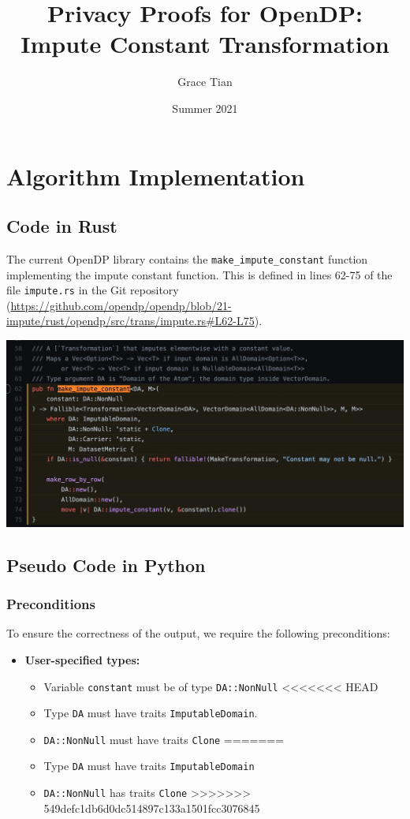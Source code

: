 \documentclass[11pt,a4paper]{article}
\title{Privacy Proofs for OpenDP: Impute Constant Transformation}
\author{Grace Tian}
\date{Summer 2021}
\begin{document}
\maketitle
\tableofcontents

\section{Algorithm Implementation}
\subsection{Code in Rust}
The current OpenDP library contains the \texttt{make\_impute\_constant} function implementing the impute constant function. This is defined in lines 62-75 of the file \texttt{impute.rs} in the Git repository (\url{https://github.com/opendp/opendp/blob/21-impute/rust/opendp/src/trans/impute.rs#L62-L75}).

\includegraphics[width=\textwidth]{make_impute_constant.jpg}


\subsection{Pseudo Code in Python}\label{sec:pseudocode}

\subsubsection*{Preconditions}
To ensure the correctness of the output, we require the following preconditions:

\begin{itemize}
    \item \textbf{User-specified types:}
    \begin{itemize}
        \item Variable \texttt{\texttt{constant}} must be of type \texttt{DA::NonNull}
<<<<<<< HEAD
        \item Type \texttt{DA} must have traits \texttt{ImputableDomain}. %
        \item \texttt{DA::NonNull} must have traits \texttt{Clone}
=======
        \item Type \texttt{DA} must have traits \texttt{ImputableDomain} 
        \item \texttt{DA::NonNull} has traits \texttt{Clone}
>>>>>>> 549defc1db6d0dc514897c133a1501fcc3076845
    \end{itemize}
\end{itemize}
\end{document}
